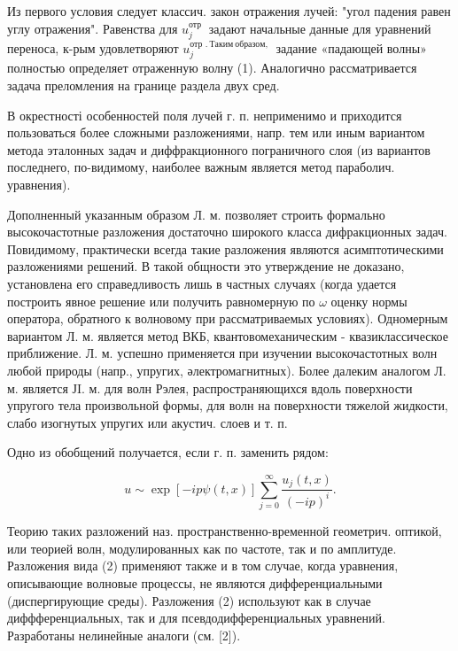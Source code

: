 \documentclass[10pt]{article}
\begin{document}
Из первого условия следует классич. закон отражения лучей: "угол падения равен углу отражения". Равенства для $u_{j}^{\text {отр }}$ задают начальные данные для уравнений переноса, к-рым удовлетворяют $u_{j}^{\text {отр } . ~ Т а к и м ~ о б р а з о м, ~}$ задание «падающей волны» полностью определяет отраженную волну (1). Аналогично рассматривается задача преломления на границе раздела двух сред.



В окрестності особенностей поля лучей г. п. неприменимо и приходится пользоваться более сложными разложениями, напр. тем или иным вариантом метода эталонных задач и диффракционного пограничного слоя (из вариантов последнего, по-видимому, наиболее важным является метод параболич. уравнения).



Дополненный указанным образом Л. м. позволяет строить формально высокочастотные разложения достаточно широкого класса дифракционных задач. Повидимому, практически всегда такие разложения являются асимптотическими разложениями решений. В такой общности это утверждение не доказано, установлена его справедливость лишь в частных случаях (когда удается построить явное решение или получить равномерную по $\omega$ оценку нормы оператора, обратного к волновому при рассматриваемых условиях). Одномерным вариантом Л. м. является метод ВКБ, квантовомеханическим - квазиклассическое приближение. Л. м. успешно применяется при изучении высокочастотных волн любой природы (напр., упругих, әлектромагнитных). Более далеким аналогом Л. м. является ЈI. м. для волн Рэлея, распространяющихся вдоль поверхности упругого тела произвольной формы, для волн на поверхности тяжелой жидкости, слабо изогнутых упругих или акустич. слоев и т. п.



Одно из обобщений получается, если г. п. заменить рядом:



\[

u \sim \exp [-i p \psi(t, x)] \sum_{j=0}^{\infty} \frac{u_{j}(t, x)}{(-i p)^{i}} .

\]



Теорию таких разложений наз. пространственно-временной геометрич. оптикой, или теорией волн, модулированных как по частоте, так и по амплитуде. Разложения вида (2) применяют также и в том случае, когда уравнения, описывающие волновые процессы, не являются дифференциальными (диспергирующие среды). Разложения (2) используют как в случае диффференциальных, так и для псевдодифференциальных уравнений. Разработаны нелинейные аналоги (см. [2]).
\end{document}
